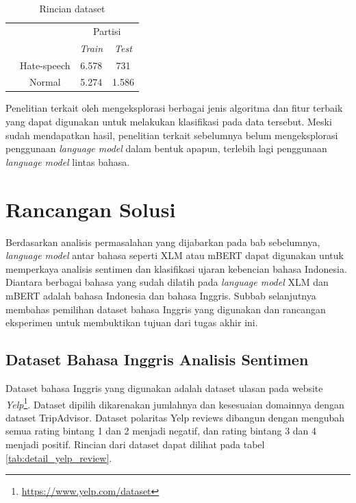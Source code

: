	\begin{table}[ht]
	    \centering
	    \caption{Rincian dataset \parencite{Ibrohim_Budi_2019}}
	    \begin{tabular}{@{}cc|cc@{}}
			\multicolumn{1}{c}{} &\multicolumn{1}{c}{} &\multicolumn{2}{c}{Partisi} \\ 
			\multicolumn{1}{c}{} & 
			\multicolumn{1}{c|}{} & 
			\multicolumn{1}{c}{\textit{Train}} & 
			\multicolumn{1}{c}{\textit{Test}} \\ 
			\cline{2-4}
			\multirow[c]{2}{*}{\rotatebox[origin=tr]{90}{Label}}
			& Hate-speech  & 6.578 & 731   \\[1.5ex]
			& Normal  & 5.274 & 1.586   \\ 
			\cline{2-4}
	    \end{tabular}
	    \label{tab:detail_data_hs}
	\end{table}

	Penelitian terkait oleh \parencite{Ibrohim_Budi_2019} mengeksplorasi berbagai jenis algoritma dan fitur terbaik yang dapat digunakan untuk melakukan klasifikasi pada data tersebut. Meski sudah mendapatkan hasil, penelitian terkait sebelumnya belum mengeksplorasi penggunaan \textit{language model} dalam bentuk apapun, terlebih lagi penggunaan \textit{language model} lintas bahasa.


\section{Rancangan Solusi}
	Berdasarkan analisis permasalahan yang dijabarkan pada bab sebelumnya, \textit{language model} antar bahasa seperti XLM atau mBERT dapat digunakan untuk memperkaya analisis sentimen dan klasifikasi ujaran kebencian bahasa Indonesia. Diantara berbagai bahasa yang sudah dilatih pada \textit{language model} XLM dan mBERT adalah bahasa Indonesia dan bahasa Inggris. Subbab selanjutnya membahas pemilihan dataset bahasa Inggris yang digunakan dan rancangan eksperimen untuk membuktikan tujuan dari tugas akhir ini.

	\subsection{Dataset Bahasa Inggris Analisis Sentimen}
	Dataset bahasa Inggris yang digunakan adalah dataset ulasan pada website \textit{Yelp}\footnote{\url{https://www.yelp.com/dataset}}. Dataset dipilih dikarenakan jumlahnya dan kesesuaian domainnya dengan dataset TripAdvisor. Dataset polaritas Yelp reviews  dibangun dengan mengubah semua rating bintang 1 dan 2 menjadi negatif, dan rating bintang 3 dan 4 menjadi positif. Rincian dari dataset dapat dilihat pada tabel \ref{tab:detail_yelp_review}.

